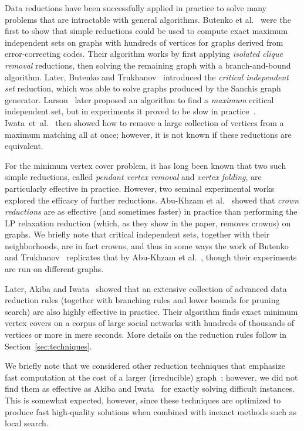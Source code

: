 \documentclass[twoside,leqno,twocolumn]{article}
\newcommand{\etal}{et~al.\xspace}
\begin{document}
Data reductions have been successfully applied in practice to solve many problems that are intractable with general algorithms. Butenko et al.~\cite{butenko-2002,butenko-correcting-codes-2009} were the first to show that simple reductions could be used to compute exact maximum independent sets on graphs with hundreds of vertices for graphs derived from error-correcting codes. Their algorithm works by first applying \emph{isolated clique removal} reductions, then solving the remaining graph with a branch-and-bound algorithm. Later, Butenko and Trukhanov~\cite{butenko-trukhanov} introduced the \emph{critical independent set} reduction, which was able to solve graphs produced by the Sanchis graph generator.
Larson~\cite{larson-2007} later proposed an algorithm to find a \emph{maximum} critical independent set, but in experiments it proved to be slow in practice~\cite{strash2016power}.
Iwata~\etal~\cite{iwata-2014} then showed how to remove a large collection of vertices from a maximum matching all at once; however, it is not known if these reductions are equivalent.

For the minimum vertex cover problem, it has long been known that two such simple reductions, called \emph{pendant vertex removal} and \emph{vertex folding}, are particularly effective in practice. However, two seminal experimental works explored the efficacy of further reductions. Abu-Khzam et al.~\cite{abu-khzam-2007} showed that \emph{crown reductions} are as effective (and sometimes faster) in practice than performing the LP relaxation reduction (which, as they show in the paper, removes crowns) on graphs. We briefly note that critical independent sets, together with their neighborhoods, are in fact crowns, and thus in some ways the work of Butenko and Trukhanov~\cite{butenko-trukhanov} replicates that by Abu-Khzam et al.~\cite{abu-khzam-2007}, though their experiments are run on different graphs.

Later, Akiba and Iwata~\cite{akiba-tcs-2016} showed that an extensive collection of advanced data reduction rules (together with branching rules and lower bounds for pruning search) are also highly effective in practice. Their algorithm finds exact minimum vertex covers on a corpus of large social networks with hundreds of thousands of vertices or more in mere seconds. More details on the reduction rules follow in Section~\ref{sec:techniques}.

We briefly note that we considered other reduction techniques that emphasize fast computation at the cost of a larger (irreducible) graph~\cite{chang2017computing,strash2016power,DBLP:conf/alenex/Hespe0S18}; however, we did not find them as effective as Akiba and Iwata~\cite{akiba-tcs-2016} for exactly solving difficult instances. This is somewhat expected, however, since these techniques are optimized to produce fast high-quality solutions when combined with inexact methods such as local search.
\end{document}
